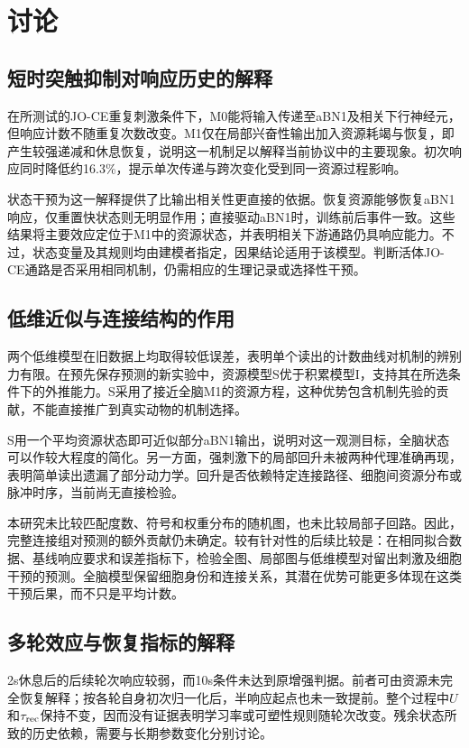 \section{讨论}
\label{sec:discussion}
\subsection{短时突触抑制对响应历史的解释}
在所测试的JO-CE重复刺激条件下，M0能将输入传递至aBN1及相关下行神经元，但响应计数不随重复次数改变。M1仅在局部兴奋性输出加入资源耗竭与恢复，即产生较强递减和休息恢复，说明这一机制足以解释当前协议中的主要现象。初次响应同时降低约16.3\%，提示单次传递与跨次变化受到同一资源过程影响。

状态干预为这一解释提供了比输出相关性更直接的依据。恢复资源能够恢复aBN1响应，仅重置快状态则无明显作用；直接驱动aBN1时，训练前后事件一致。这些结果将主要效应定位于M1中的资源状态，并表明相关下游通路仍具响应能力。不过，状态变量及其规则均由建模者指定，因果结论适用于该模型。判断活体JO-CE通路是否采用相同机制，仍需相应的生理记录或选择性干预。

\subsection{低维近似与连接结构的作用}
两个低维模型在旧数据上均取得较低误差，表明单个读出的计数曲线对机制的辨别力有限。在预先保存预测的新实验中，资源模型S优于积累模型I，支持其在所选条件下的外推能力。S采用了接近全脑M1的资源方程，这种优势包含机制先验的贡献，不能直接推广到真实动物的机制选择。

S用一个平均资源状态即可近似部分aBN1输出，说明对这一观测目标，全脑状态可以作较大程度的简化。另一方面，强刺激下的局部回升未被两种代理准确再现，表明简单读出遗漏了部分动力学。回升是否依赖特定连接路径、细胞间资源分布或脉冲时序，当前尚无直接检验。

本研究未比较匹配度数、符号和权重分布的随机图，也未比较局部子回路。因此，完整连接组对预测的额外贡献仍未确定。较有针对性的后续比较是：在相同拟合数据、基线响应要求和误差指标下，检验全图、局部图与低维模型对留出刺激及细胞干预的预测。全脑模型保留细胞身份和连接关系，其潜在优势可能更多体现在这类干预后果，而不只是平均计数。

\subsection{多轮效应与恢复指标的解释}
2s休息后的后续轮次响应较弱，而10s条件未达到原增强判据。前者可由资源未完全恢复解释；按各轮自身初次归一化后，半响应起点也未一致提前。整个过程中$U$和$\tau_{\rm rec}$保持不变，因而没有证据表明学习率或可塑性规则随轮次改变。残余状态所致的历史依赖，需要与长期参数变化分别讨论。

